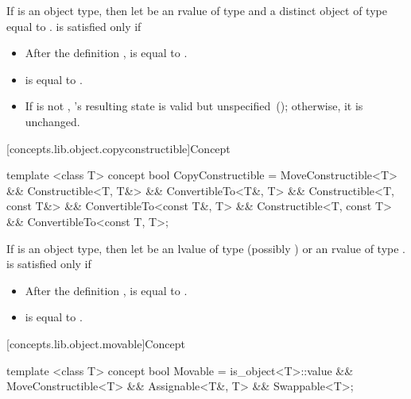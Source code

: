 \begin{itemdescr}
\pnum
If  is an object type, then let  be an rvalue of type 
and  a distinct object of type  equal to .
 is satisfied only if

\begin{itemize}
\item After the definition ,  is equal to .

\item {} is equal to .

\item If  is not , 's resulting state is valid
but unspecified~(); otherwise, it is unchanged.
\end{itemize}
\end{itemdescr}

[concepts.lib.object.copyconstructible]{Concept }

%
\begin{itemdecl}
template <class T>
concept bool CopyConstructible =
  MoveConstructible<T> &&
  Constructible<T, T&> && ConvertibleTo<T&, T> &&
  Constructible<T, const T&> && ConvertibleTo<const T&, T> &&
  Constructible<T, const T> && ConvertibleTo<const T, T>;
\end{itemdecl}

\begin{itemdescr}
\pnum
If  is an object type, then let  be an lvalue of type (possibly
)  or an rvalue of type .
 is satisfied only if

\begin{itemize}
\item After the definition ,  is equal to .

\item {} is equal to .
\end{itemize}

\end{itemdescr}

[concepts.lib.object.movable]{Concept }

%
\begin{itemdecl}
template <class T>
concept bool Movable =
  is_object<T>::value &&
  MoveConstructible<T> &&
  Assignable<T&, T> &&
  Swappable<T>;
\end{itemdecl}

